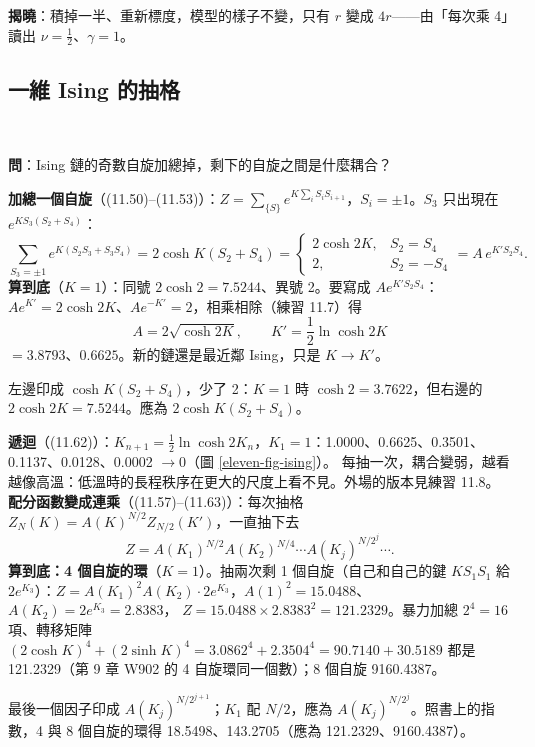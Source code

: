 \textbf{揭曉}：積掉一半、重新標度，模型的樣子不變，只有 $r$ 變成 $4r$——由「每次乘 4」讀出 $\nu=\frac12$、$\gamma=1$。

\subsection{一維 Ising 的抽格}
\leavevmode{}\ \par\nopagebreak

\textbf{問}：Ising 鏈的奇數自旋加總掉，剩下的自旋之間是什麼耦合？

\textbf{加總一個自旋}（(11.50)--(11.53)）：$Z=\sum_{\{S\}}e^{K\sum_iS_iS_{i+1}}$，$S_i=\pm1$。$S_3$ 只出現在 $e^{KS_3(S_2+S_4)}$：
\[\sum_{S_3=\pm1}e^{K(S_2S_3+S_3S_4)}=2\cosh K(S_2+S_4)=\begin{cases}2\cosh2K,&S_2=S_4\\2,&S_2=-S_4\end{cases}=A\,e^{K'S_2S_4}.\tag{11.52--11.53}\]
\textbf{算到底}（$K=1$）：同號 $2\cosh2=7.5244$、異號 2。要寫成 $Ae^{K'S_2S_4}$：$Ae^{K'}=2\cosh2K$、$Ae^{-K'}=2$，相乘相除（練習 11.7）得
\[A=2\sqrt{\cosh2K},\qquad K'=\frac12\ln\cosh2K\tag{11.54--11.55}\]
$=3.8793$、$0.6625$。新的鏈還是最近鄰 Ising，只是 $K\to K'$。
\begin{errbox}[p.~270，(11.53)]
左邊印成 $\cosh K(S_2+S_4)$，少了 2：$K=1$ 時 $\cosh2=3.7622$，但右邊的 $2\cosh2K=7.5244$。應為 $2\cosh K(S_2+S_4)$。
\end{errbox}
\textbf{遞迴}（(11.62)）：$K_{n+1}=\frac12\ln\cosh2K_n$，$K_1=1$：1.0000、0.6625、0.3501、0.1137、0.0128、0.0002 $\to0$（圖 \ref{eleven-fig-ising}）。
每抽一次，耦合變弱，越看越像高溫：低溫時的長程秩序在更大的尺度上看不見。外場的版本見練習 11.8。
\textbf{配分函數變成連乘}（(11.57)--(11.63)）：每次抽格 $Z_N(K)=A(K)^{N/2}Z_{N/2}(K')$，一直抽下去
\[Z=A(K_1)^{N/2}A(K_2)^{N/4}\cdots A(K_j)^{N/2^j}\cdots .\tag{11.63}\]
\textbf{算到底：4 個自旋的環}（$K=1$）。抽兩次剩 1 個自旋（自己和自己的鍵 $KS_1S_1$ 給 $2e^{K_3}$）：$Z=A(K_1)^2A(K_2)\cdot2e^{K_3}$，$A(1)^2=15.0488$、$A(K_2)=2e^{K_3}=2.8383$，
$Z=15.0488\times2.8383^2=121.2329$。暴力加總 $2^4=16$ 項、轉移矩陣 $(2\cosh K)^4+(2\sinh K)^4=3.0862^4+2.3504^4=90.7140+30.5189$ 都是 121.2329（第 9 章 W902 的 4 自旋環同一個數）；8 個自旋 9160.4387。
\begin{errbox}[p.~271，(11.63)]
最後一個因子印成 $A(K_j)^{N/2^{j+1}}$；$K_1$ 配 $N/2$，應為 $A(K_j)^{N/2^j}$。照書上的指數，4 與 8 個自旋的環得 18.5498、143.2705（應為 121.2329、9160.4387）。
\end{errbox}

